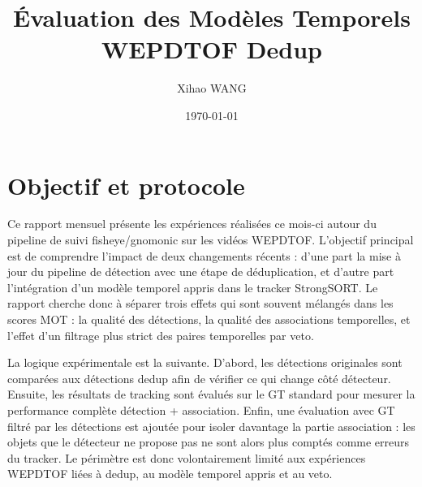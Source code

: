 \documentclass[11pt,a4paper]{article}
\title{Évaluation des Modèles Temporels WEPDTOF Dedup}
\author{Xihao WANG}
\date{\today}
\begin{document}
\maketitle

\section{Objectif et protocole}

Ce rapport mensuel présente les expériences réalisées ce mois-ci autour du pipeline de suivi fisheye/gnomonic sur les vidéos WEPDTOF. L'objectif principal est de comprendre l'impact de deux changements récents : d'une part la mise à jour du pipeline de détection avec une étape de déduplication, et d'autre part l'intégration d'un modèle temporel appris dans le tracker StrongSORT. Le rapport cherche donc à séparer trois effets qui sont souvent mélangés dans les scores MOT : la qualité des détections, la qualité des associations temporelles, et l'effet d'un filtrage plus strict des paires temporelles par veto.

La logique expérimentale est la suivante. D'abord, les détections originales sont comparées aux détections dedup afin de vérifier ce qui change côté détecteur. Ensuite, les résultats de tracking sont évalués sur le GT standard pour mesurer la performance complète détection + association. Enfin, une évaluation avec GT filtré par les détections est ajoutée pour isoler davantage la partie association : les objets que le détecteur ne propose pas ne sont alors plus comptés comme erreurs du tracker. Le périmètre est donc volontairement limité aux expériences WEPDTOF liées à dedup, au modèle temporel appris et au veto.
\end{document}
